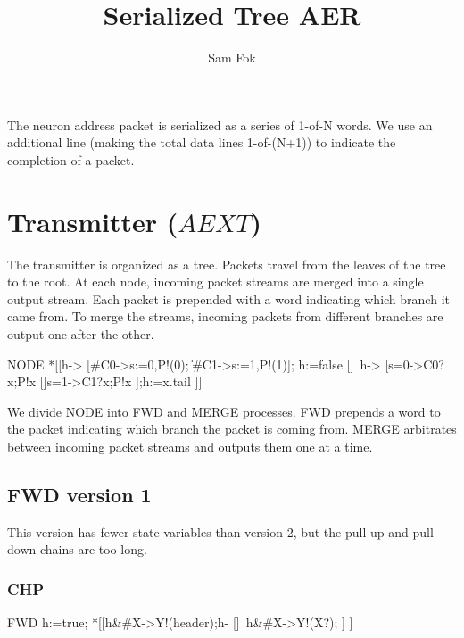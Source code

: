 \documentclass{article}
\begin{document}
\title{Serialized Tree AER}
\author{Sam Fok}
\maketitle

The neuron address packet is serialized as a series of 1-of-N words. 
We use an additional line (making the total data lines 1-of-(N+1)) to indicate the completion of a packet.

\section{Transmitter ($AEXT$)}

The transmitter is organized as a tree. Packets travel from the leaves of the tree to the root. At each node, incoming packet streams are merged into a single output stream. Each packet is prepended with a word indicating which branch it came from. To merge the streams, incoming packets from different branches are output one after the other. 

\begin{csp}
NODE\equiv
*[[h->
    [#{C0}->s:=0,P!(0);
    \|#{C1}->s:=1,P!(1)];
    h:=false
  []~h->
    [s=0->C0?x;P!x
    []s=1->C1?x;P!x
    ];h:=x.tail
 ]]
\end{csp}

We divide NODE into FWD and MERGE processes. 
FWD prepends a word to the packet indicating which branch the packet is coming from.
MERGE arbitrates between incoming packet streams and outputs them one at a time.

\subsection{FWD version 1}

This version has fewer state variables than version 2, but the pull-up and pull-down chains are too long.

\subsubsection*{CHP}

\begin{csp}
FWD\equiv
  h:=true;
  *[[h&#{X}->Y!(\textrm{header});h-
    []~h&#{X}->Y!(X?)\*[X=t->h+];
    ]
   ]
\end{csp}
\end{document}

